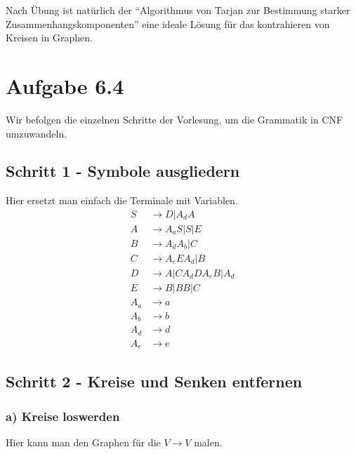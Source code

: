 \documentclass{article}
\begin{document}
Nach Übung ist natürlich der ``Algorithmus von Tarjan zur Bestimmung starker Zusammenhangskomponenten'' eine ideale Lösung für das kontrahieren von Kreisen in Graphen.



\section*{Aufgabe 6.4}
Wir befolgen die einzelnen Schritte der Vorlesung, um die Grammatik in CNF umzuwandeln.
\subsection*{Schritt 1 - Symbole ausgliedern}
Hier ersetzt man einfach die Terminale mit Variablen.
\begin{align*}
S&\rightarrow D | A_dA\\
A&\rightarrow A_aS | S | E\\
B&\rightarrow A_dA_b | C\\
C&\rightarrow A_eEA_d | B\\
D&\rightarrow A | CA_dDA_eB | A_d\\
E&\rightarrow B | BB | C\\
A_a&\rightarrow a\\
A_b&\rightarrow b\\
A_d&\rightarrow d\\
A_e&\rightarrow e
\end{align*}
\subsection*{Schritt 2 - Kreise und Senken entfernen}
\subsubsection*{a) Kreise loswerden}
Hier kann man den Graphen für die $V \rightarrow V$ malen. 
\end{document}
